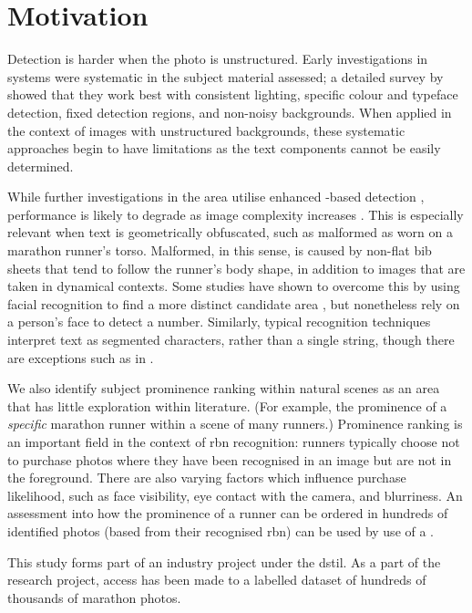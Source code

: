 \section{Motivation}
\label{sec:introduction:motivation}

Detection is harder when the photo is unstructured. Early investigations in  systems were systematic in the subject material assessed; a detailed survey by \cite{Anagnostopoulos:2008vu} showed that they work best  with consistent lighting, specific colour and typeface detection, fixed detection regions, and non-noisy backgrounds. When applied in the context of images with unstructured backgrounds, these systematic approaches begin to have limitations as the text components cannot be easily determined.

While further investigations in the area utilise enhanced -based detection \citep{Chen:2011ul,Shivakumara:2011dn,Epshtein:2010tj}, performance is likely to degrade as image complexity increases \citep{Li:2012wd}. This is especially relevant when text is geometrically obfuscated, such as malformed  as worn on a marathon runner's torso. Malformed, in this sense, is caused by non-flat bib sheets that tend to follow the runner's body shape, in addition to images that are taken in dynamical contexts. Some studies have shown to overcome this by using facial recognition to find a more distinct candidate area \citep{Benami:2012jf}, but nonetheless rely on a person's face to detect a number. Similarly, typical recognition techniques interpret text as segmented characters, rather than a single string, though there are exceptions such as in \citet{Zhu:2016ut}.

We also identify subject prominence ranking within natural scenes as an area that has little exploration within literature. (For example, the prominence of a \textit{specific} marathon runner within a scene of many runners.) Prominence ranking is an important field in the context of \gls{rbn} recognition: runners typically choose not to purchase photos where they have been recognised in an image but are not in the foreground. There are also varying factors which influence purchase likelihood, such as face visibility, eye contact with the camera, and blurriness. An assessment into how the prominence of a runner can be ordered in hundreds of identified photos (based from their recognised \gls{rbn}) can be used by use of a .

This study forms part of an industry project under the \gls{dstil}. As a part of the research project, access has been made to a labelled dataset of hundreds of thousands of marathon photos.


